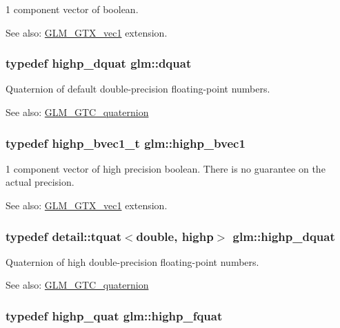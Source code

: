 1 component vector of boolean. \begin{Desc}
\item[See also:]\hyperlink{group__gtx__vec1}{GLM\_\-GTX\_\-vec1} extension. \end{Desc}
\hypertarget{namespaceglm_49693161673a003b4a8fd4d8b15b0b7b}{
\subsubsection[dquat]{\setlength{\rightskip}{0pt plus 5cm}typedef {\bf highp\_\-dquat} {\bf glm::dquat}}}
\label{namespaceglm_49693161673a003b4a8fd4d8b15b0b7b}


Quaternion of default double-precision floating-point numbers.

\begin{Desc}
\item[See also:]\hyperlink{group__gtc__quaternion}{GLM\_\-GTC\_\-quaternion} \end{Desc}
\hypertarget{namespaceglm_d24a2ac97dbfbece48f504224bb20b59}{
\subsubsection[highp\_\-bvec1]{\setlength{\rightskip}{0pt plus 5cm}typedef highp\_\-bvec1\_\-t {\bf glm::highp\_\-bvec1}}}
\label{namespaceglm_d24a2ac97dbfbece48f504224bb20b59}


1 component vector of high precision boolean. There is no guarantee on the actual precision. \begin{Desc}
\item[See also:]\hyperlink{group__gtx__vec1}{GLM\_\-GTX\_\-vec1} extension. \end{Desc}
\hypertarget{namespaceglm_6504747f6a2ec4a369a51244fcabc61e}{
\subsubsection[highp\_\-dquat]{\setlength{\rightskip}{0pt plus 5cm}typedef detail::tquat$<$double, highp$>$ {\bf glm::highp\_\-dquat}}}
\label{namespaceglm_6504747f6a2ec4a369a51244fcabc61e}


Quaternion of high double-precision floating-point numbers.

\begin{Desc}
\item[See also:]\hyperlink{group__gtc__quaternion}{GLM\_\-GTC\_\-quaternion} \end{Desc}
\hypertarget{namespaceglm_d1acf6af4ae4af94dfec8814b058d5eb}{
\subsubsection[highp\_\-fquat]{\setlength{\rightskip}{0pt plus 5cm}typedef {\bf highp\_\-quat} {\bf glm::highp\_\-fquat}}}
\label{namespaceglm_d1acf6af4ae4af94dfec8814b058d5eb}


